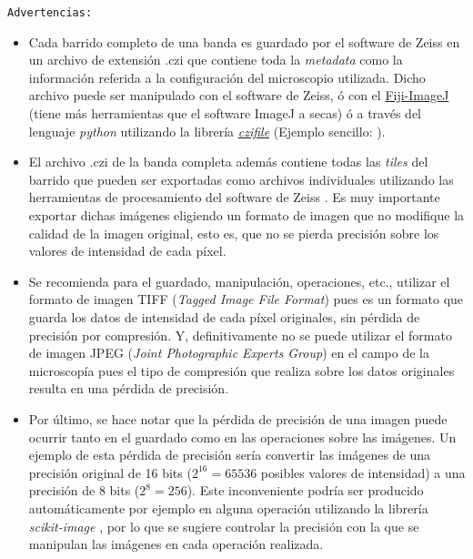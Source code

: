 \begin{warningbox}{}
\faExclamationTriangle \hspace{2pt} \texttt{Advertencias:}\par
\begin{itemize}
\justifying
\item Cada barrido completo de una banda es guardado por el software de Zeiss en un archivo de extensión .czi que contiene toda la \textit{metadata} como la información referida a la configuración del microscopio utilizada. Dicho archivo puede ser manipulado con el software de Zeiss, ó con el \href{https://imagej.net/Fiji}{Fiji-ImageJ} (tiene más herramientas que el software ImageJ a secas) ó a través del lenguaje \textit{python} utilizando la librería \href{https://pypi.org/project/czifile/}{\textit{czifile}} (Ejemplo sencillo: \href{https://github.com/jrr1984/defects_analysis/blob/master/zeiss_cfi.ipynb}{\faGithub}).
\item El archivo .czi de la banda completa además contiene todas las \textit{tiles} del barrido que pueden ser exportadas como archivos individuales utilizando las herramientas de procesamiento del software de Zeiss \cite{tilezeiss}. Es muy importante exportar dichas imágenes eligiendo un formato de imagen que no modifique la calidad de la imagen original, esto es, que no se pierda precisión sobre los valores de intensidad de cada píxel. 
\item Se recomienda para el guardado, manipulación, operaciones, etc., utilizar el formato de imagen TIFF (\textit{Tagged Image File Format}) pues es un formato que guarda los datos de intensidad de cada píxel originales, sin pérdida de precisión por compresión. Y, definitivamente no se puede utilizar el formato de imagen JPEG (\textit{Joint Photographic Experts Group}) en el campo de la microscopía pues el tipo de compresión que realiza sobre los datos originales resulta en una pérdida de precisión.
\item Por último, se hace notar que la pérdida de precisión de una imagen puede ocurrir tanto en el guardado como en las operaciones sobre las imágenes. Un ejemplo de esta pérdida de precisión sería convertir las imágenes de una precisión original de 16 bits ($2^{16} = 65536$ posibles valores de intensidad) a una precisión de 8 bits ($2^{8} = 256$). Este inconveniente podría ser producido automáticamente por ejemplo en alguna operación utilizando la librería \textit{scikit-image} \cite{van2014scikit}, por lo que se sugiere controlar la precisión con la que se manipulan las imágenes en cada operación realizada.
\end{itemize}

\end{warningbox}	

